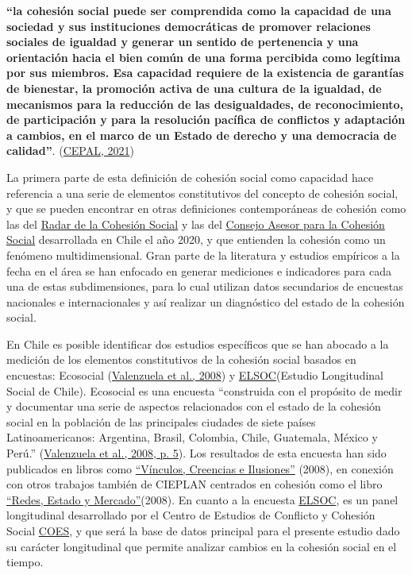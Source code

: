 \documentclass[
  12pt,
]{book}
\begin{document}
\textbf{``la cohesión social puede ser comprendida como la capacidad de una sociedad y sus instituciones democráticas de promover relaciones sociales de igualdad y generar un sentido de pertenencia y una orientación hacia el bien común de una forma percibida como legítima por sus miembros. Esa capacidad requiere de la existencia de garantías de bienestar, la promoción activa de una cultura de la igualdad, de mecanismos para la reducción de las desigualdades, de reconocimiento, de participación y para la resolución pacífica de conflictos y adaptación a cambios, en el marco de un Estado de derecho y una democracia de calidad''}. (\protect\hyperlink{ref-cepal_cohesion_2021}{CEPAL, 2021})

La primera parte de esta definición de cohesión social como capacidad hace referencia a una serie de elementos constitutivos del concepto de cohesión social, y que se pueden encontrar en otras definiciones contemporáneas de cohesión como las del \href{https://www.bertelsmann-stiftung.de/en/publications/publication/did/social-cohesion-radar/}{Radar de la Cohesión Social} y las del \href{https://www.desarrollosocialyfamilia.gob.cl/storage/docs/Informe_Final_Consejo_Cohesion_Social.pdf}{Consejo Asesor para la Cohesión Social} desarrollada en Chile el año 2020, y que entienden la cohesión como un fenómeno multidimensional. Gran parte de la literatura y estudios empíricos a la fecha en el área se han enfocado en generar mediciones e indicadores para cada una de estas subdimensiones, para lo cual utilizan datos secundarios de encuestas nacionales e internacionales y así realizar un diagnóstico del estado de la cohesión social.

En Chile es posible identificar dos estudios específicos que se han abocado a la medición de los elementos constitutivos de la cohesión social basados en encuestas: Ecosocial (\protect\hyperlink{ref-valenzuela_vinculos_2008}{Valenzuela et al., 2008}) y \href{https://coes.cl/encuesta-panel/}{ELSOC}(Estudio Longitudinal Social de Chile). Ecosocial es una encuesta ``construida con el propósito de medir y documentar una serie de aspectos relacionados con el estado de la cohesión social en la población de las principales ciudades de siete países Latinoamericanos: Argentina, Brasil, Colombia, Chile, Guatemala, México y Perú.'' (\protect\hyperlink{ref-valenzuela_vinculos_2008}{Valenzuela et al., 2008, p. 5}). Los resultados de esta encuesta han sido publicados en libros como \href{https://www.cieplan.org/wp-content/uploads/2019/12/Libro_Completo_Vinculos_Creencia_e_Ilusiones.pdf}{``Vínculos, Creencias e Ilusiones''} (2008), en conexión con otros trabajos también de CIEPLAN centrados en cohesión como el libro \href{https://www.cieplan.org/wp-content/uploads/2019/12/Libro_Completo_Redes_Estado_y_Mercado_compressed.pdf}{``Redes, Estado y Mercado''}(2008). En cuanto a la encuesta \href{https://coes.cl/encuesta-panel/}{ELSOC}, es un panel longitudinal desarrollado por el Centro de Estudios de Conflicto y Cohesión Social \href{https://www.coes.cl/}{COES}, y que será la base de datos principal para el presente estudio dado su carácter longitudinal que permite analizar cambios en la cohesión social en el tiempo.
\end{document}
